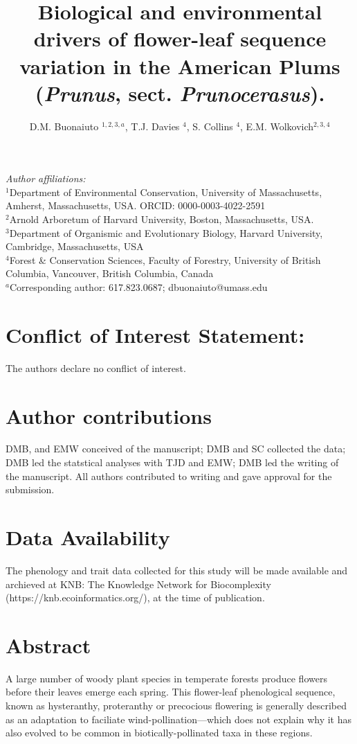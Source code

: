 \documentclass{article}[11pt]
\title{Biological and environmental drivers of flower-leaf sequence variation in the American Plums (\emph{Prunus}, sect. \emph{Prunocerasus}). }
\author{D.M. Buonaiuto $^{1,2,3,a}$, T.J. Davies $^{4}$, S. Collins $^{4}$, E.M. Wolkovich$^{2,3,4}$}
\begin{document}

\maketitle
\noindent \emph{Author affiliations:}\\
\noindent $^1$Department of Environmental Conservation, University of Massachusetts, Amherst, Massachusetts, USA. ORCID: 0000-0003-4022-2591\\
\noindent 
$^2$Arnold Arboretum of Harvard University, Boston, Massachusetts, USA.\\
$^3$Department of Organismic and Evolutionary Biology, Harvard University, Cambridge, Massachusetts, USA \\
$^4$Forest \& Conservation Sciences, Faculty of Forestry, University of British Columbia, Vancouver, British Columbia, Canada\\
$^a$Corresponding author: 617.823.0687; dbuonaiuto@umass.edu\\

\section*{Conflict of Interest Statement:}
The authors declare no conflict of interest.

\section*{Author contributions}
DMB, and EMW conceived of the manuscript; DMB and SC collected the data; DMB led the statstical analyses with TJD and EMW; DMB led the writing of the manuscript. All authors contributed to writing and gave approval for the submission.

\section*{Data Availability}
The phenology and trait data collected for this study will be made available and archieved at KNB: The Knowledge Network for Biocomplexity (https://knb.ecoinformatics.org/), at the time of publication.

\pagebreak

\section*{Abstract}
A large number of woody plant species in temperate forests produce flowers before their leaves emerge each spring. This flower-leaf phenological sequence, known as hysteranthy, proteranthy or precocious flowering is generally described as an adaptation to faciliate wind-pollination---which does not explain why it has also evolved to be common in biotically-pollinated taxa in these regions. 
\end{document}
